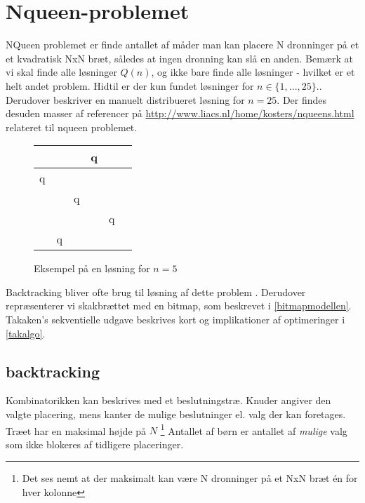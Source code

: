 \documentclass[draft,a4paper,10pt]{article}
\def\chs#1{{\chessfont#1}}
\begin{document}
\section{Nqueen-problemet}\label{nqueenproblemet}

NQueen problemet er finde antallet af måder man kan placere N dronninger på et et kvadratisk NxN bræt, således at ingen dronning kan slå en anden. Bemærk at vi skal finde alle løsninger $Q(n)$, og ikke bare finde alle løsninger - hvilket er et helt andet problem. Hidtil er der kun fundet løsninger for $n \in \{1,...,25\}$.\cite{sekvenser}. Derudover beskriver \cite{etsi} en manuelt distribueret løsning for $n=25$. Der findes desuden masser af referencer på \url{http://www.liacs.nl/home/kosters/nqueens.html} relateret til nqueen problemet. 



\begin{figure}
\begin{center}
\begin{tabular}{|c|c|c|c|c|c}
\hline	 &  & &   \chs{q} & \\
\hline	\chs{q} & &  &  & \\
\hline	 & & \chs{q} &  &  \\
\hline	 &  &  & & \chs{q} \\
\hline	 & \chs{q} & &  &  \\
\hline
\end{tabular}
\end{center}
\caption{Eksempel på en løsning for $n=5$}
\end{figure}

Backtracking bliver ofte brug til løsning af dette problem . Derudover repræsenterer vi skakbrættet med en bitmap, som beskrevet i \ref{bitmapmodellen}. Takaken's sekventielle udgave beskrives kort og implikationer af optimeringer i \ref{takalgo}.


\subsection{backtracking}


Kombinatorikken kan beskrives med et beslutningstræ. Knuder angiver den valgte placering, mens kanter de mulige beslutninger el. valg der kan foretages.  Træet har en maksimal højde på $N$ \footnote{Det ses nemt at der maksimalt kan være N dronninger på et NxN bræt én for hver kolonne}
Antallet af børn er antallet af \textit{mulige} valg som ikke blokeres af tidligere placeringer. 
\end{document}
